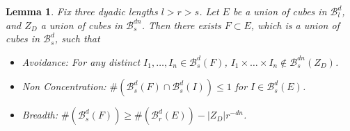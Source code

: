 \documentclass[usenames,dvipsnames]{article}
\theoremstyle{plain}
\newtheorem{lemma}{Lemma}
\theoremstyle{plain}
\begin{document}
\begin{lemma}
	Fix three dyadic lengths $l > r > s$. Let $E$ be a union of cubes in $\mathcal{B}^d_l$, and $Z_D$ a union of cubes in $\mathcal{B}^{dn}_s$. Then there exists $F \subset E$, which is a union of cubes in $\mathcal{B}^d_s$, such that
	\begin{itemize}
		\item \emph{Avoidance}:  For any distinct $I_1, \dots, I_n \in \mathcal{B}^d_s(F)$, $I_1 \times \dots \times I_n \not \in \mathcal{B}^{dn}_s(Z_D)$.
		\item \emph{Non Concentration}: $\# (\mathcal{B}^d_s(F) \cap \mathcal{B}^d_s(I)) \leq 1$ for $I \in \mathcal{B}^d_s(E)$.
		\item \emph{Breadth}: $\# (\mathcal{B}^d_s(F)) \geq \# (\mathcal{B}^d_r(E)) - |Z_D| r^{-dn}$.
	\end{itemize}
\end{lemma}
\end{document}

